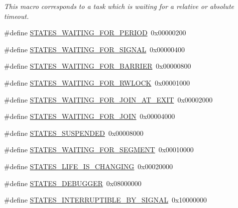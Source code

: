 \begin{DoxyCompactItemize}
\begin{DoxyCompactList}\small\item\em This macro corresponds to a task which is waiting for a relative or absolute timeout. \end{DoxyCompactList}\item 
\#define \mbox{\hyperlink{group__RTEMSScoreStates_ga84fdaeebe83d4623cb7b709a96aa52b3}{S\+T\+A\+T\+E\+S\+\_\+\+W\+A\+I\+T\+I\+N\+G\+\_\+\+F\+O\+R\+\_\+\+P\+E\+R\+I\+OD}}~0x00000200
\item 
\#define \mbox{\hyperlink{group__RTEMSScoreStates_ga568c03c478c18dda78ba985e70fbf7a1}{S\+T\+A\+T\+E\+S\+\_\+\+W\+A\+I\+T\+I\+N\+G\+\_\+\+F\+O\+R\+\_\+\+S\+I\+G\+N\+AL}}~0x00000400
\item 
\#define \mbox{\hyperlink{group__RTEMSScoreStates_ga53e25c2357b7e0a61cdd414899899c1e}{S\+T\+A\+T\+E\+S\+\_\+\+W\+A\+I\+T\+I\+N\+G\+\_\+\+F\+O\+R\+\_\+\+B\+A\+R\+R\+I\+ER}}~0x00000800
\item 
\#define \mbox{\hyperlink{group__RTEMSScoreStates_gaf98d1557c83b48b9ec52902aa80906b8}{S\+T\+A\+T\+E\+S\+\_\+\+W\+A\+I\+T\+I\+N\+G\+\_\+\+F\+O\+R\+\_\+\+R\+W\+L\+O\+CK}}~0x00001000
\item 
\#define \mbox{\hyperlink{group__RTEMSScoreStates_ga6e0033d97aad1e5e544cfa0550276e15}{S\+T\+A\+T\+E\+S\+\_\+\+W\+A\+I\+T\+I\+N\+G\+\_\+\+F\+O\+R\+\_\+\+J\+O\+I\+N\+\_\+\+A\+T\+\_\+\+E\+X\+IT}}~0x00002000
\item 
\#define \mbox{\hyperlink{group__RTEMSScoreStates_gac430b970fe52add65b336d72f6439305}{S\+T\+A\+T\+E\+S\+\_\+\+W\+A\+I\+T\+I\+N\+G\+\_\+\+F\+O\+R\+\_\+\+J\+O\+IN}}~0x00004000
\item 
\#define \mbox{\hyperlink{group__RTEMSScoreStates_gaeb28d9cc3a5a4ff4c4113bc77d956d42}{S\+T\+A\+T\+E\+S\+\_\+\+S\+U\+S\+P\+E\+N\+D\+ED}}~0x00008000
\item 
\#define \mbox{\hyperlink{group__RTEMSScoreStates_ga30db75be7c3644beead22267dc81b331}{S\+T\+A\+T\+E\+S\+\_\+\+W\+A\+I\+T\+I\+N\+G\+\_\+\+F\+O\+R\+\_\+\+S\+E\+G\+M\+E\+NT}}~0x00010000
\item 
\#define \mbox{\hyperlink{group__RTEMSScoreStates_ga4309b32840965dfdde4bbaea39143f93}{S\+T\+A\+T\+E\+S\+\_\+\+L\+I\+F\+E\+\_\+\+I\+S\+\_\+\+C\+H\+A\+N\+G\+I\+NG}}~0x00020000
\item 
\#define \mbox{\hyperlink{group__RTEMSScoreStates_gab0078d7cb2ebaa876ff454a370c726b5}{S\+T\+A\+T\+E\+S\+\_\+\+D\+E\+B\+U\+G\+G\+ER}}~0x08000000
\item 
\#define \mbox{\hyperlink{group__RTEMSScoreStates_ga16a253d422d68f46844a99ee1e80eea3}{S\+T\+A\+T\+E\+S\+\_\+\+I\+N\+T\+E\+R\+R\+U\+P\+T\+I\+B\+L\+E\+\_\+\+B\+Y\+\_\+\+S\+I\+G\+N\+AL}}~0x10000000

\end{DoxyCompactItemize}
